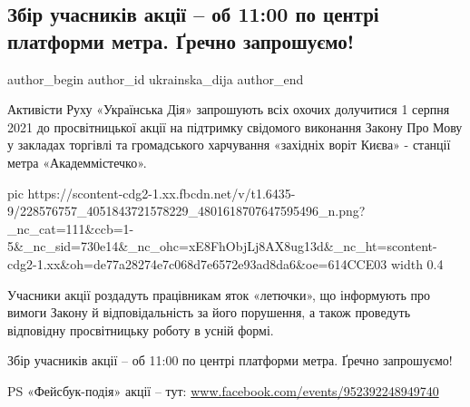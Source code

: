  
 
 
 
 
 
\subsection{Збір учасників акції – об 11:00 по центрі платформи метра. Ґречно запрошуємо!}
\label{sec:30_07_2021.fb.ukrainska_dija.1.kiev_ukrainizacia_akcia}
 
\ifcmt
 author_begin
   author_id ukrainska_dija
 author_end
\fi

Активісти Руху «Українська Дія» запрошують всіх охочих долучитися 1 серпня 2021
до просвітницької акції на підтримку свідомого виконання Закону Про Мову у
закладах торгівлі та громадського харчування «західніх воріт Києва» - станції
метра «Академмістечко».

\ifcmt
  pic https://scontent-cdg2-1.xx.fbcdn.net/v/t1.6435-9/228576757_4051843721578229_4801618707647595496_n.png?_nc_cat=111&ccb=1-5&_nc_sid=730e14&_nc_ohc=xE8FhObjLj8AX8ug13d&_nc_ht=scontent-cdg2-1.xx&oh=de77a28274e7c068d7e6572e93ad8da6&oe=614CCE03
  width 0.4
\fi

Учасники акції роздадуть працівникам яток «летючки», що інформують про вимоги
Закону й відповідальність за його порушення, а також проведуть відповідну
просвітницьку роботу в усній формі.

Збір учасників акції – об 11:00 по центрі платформи метра. Ґречно запрошуємо!

PS «Фейсбук-подія» акції – тут: \url{www.facebook.com/events/952392248949740}


